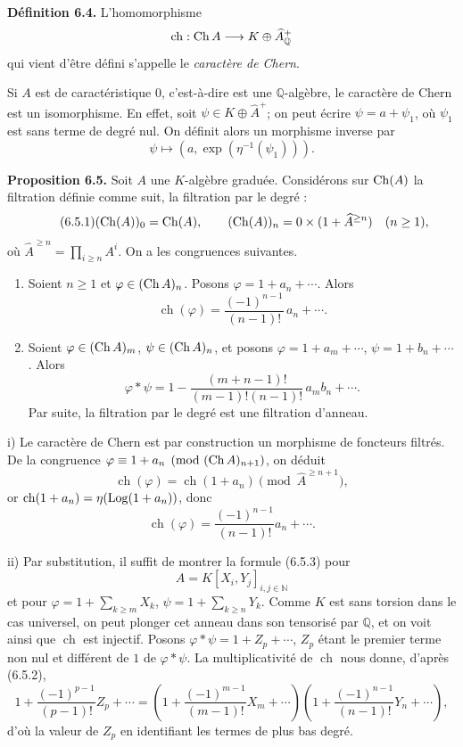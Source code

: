 \documentclass[11pt]{article}
\newcommand{\ch}{\operatorname{ch}}
\providecommand{\ch}{\operatorname{ch}}
\begin{document}
\textbf{Définition 6.4.} L'homomorphisme
\[
  \ch:\Ch A\longrightarrow K\oplus\widehat A_{\mathbb Q}^{+}
\]
qui vient d'être défini s'appelle le \emph{caractère de Chern}.

Si \(A\) est de caractéristique \(0\), c'est-à-dire est une \(\mathbb Q\)-algèbre, le caractère de Chern est un isomorphisme. En effet, soit \(\psi\in K\oplus\widehat A^+\); on peut écrire \(\psi=a+\psi_1\), où \(\psi_1\) est sans terme de degré nul. On définit alors un morphisme inverse par
\[
  \psi\longmapsto (a,\exp(\eta^{-1}(\psi_1))).
\]

\textbf{Proposition 6.5.} Soit \(A\) une \(K\)-algèbre graduée. Considérons sur \(\operatorname{Ch}(A)\) la filtration définie comme suit, la filtration par le degré :
\begin{equation}\tag{6.5.1}
  (\operatorname{Ch}(A))_0=\operatorname{Ch}(A),\qquad
  (\operatorname{Ch}(A))_n=0\times(1+\widehat A^{\ge n})\quad(n\ge1),
\end{equation}
où \(\widehat A^{\ge n}=\prod_{i\ge n}A^i\). On a les congruences suivantes.

\begin{enumerate}[label=\roman*)]
\item Soient \(n\ge1\) et \(\varphi\in(\operatorname{Ch} A)_n\). Posons \(\varphi=1+a_n+\cdots\). Alors
\begin{equation}\tag{6.5.2}
  \ch(\varphi)=\frac{(-1)^{n-1}}{(n-1)!}\,a_n+\cdots .
\end{equation}

\item Soient \(\varphi\in(\operatorname{Ch} A)_m\), \(\psi\in(\operatorname{Ch} A)_n\), et posons
\(\varphi=1+a_m+\cdots\), \(\psi=1+b_n+\cdots\). Alors
\begin{equation}\tag{6.5.3}
  \varphi*\psi
  =
  1-\frac{(m+n-1)!}{(m-1)!(n-1)!}\,a_m b_n+\cdots .
\end{equation}
Par suite, la filtration par le degré est une filtration d'anneau.
\end{enumerate}

i) Le caractère de Chern est par construction un morphisme de foncteurs filtrés. De la congruence \(\varphi\equiv1+a_n\pmod{(\operatorname{Ch} A)_{n+1}}\), on déduit
\[
  \ch(\varphi)=\ch(1+a_n)\pmod{\widehat A^{\ge n+1}},
\]
or \(\ch(1+a_n)=\eta(\Log(1+a_n))\), donc
\[
  \ch(\varphi)=\frac{(-1)^{n-1}}{(n-1)!}a_n+\cdots .
\]

ii) Par substitution, il suffit de montrer la formule (6.5.3) pour
\[
 A=K[X_i,Y_j]_{i,j\in\mathbb N}
\]
et pour \(\varphi=1+\sum_{k\ge m}X_k\), \(\psi=1+\sum_{k\ge n}Y_k\). Comme \(K\) est sans torsion dans le cas universel, on peut plonger cet anneau dans son tensorisé par \(\mathbb Q\), et on voit ainsi que \(\ch\) est injectif. Posons \(\varphi*\psi=1+Z_p+\cdots\), \(Z_p\) étant le premier terme non nul et différent de \(1\) de \(\varphi*\psi\). La multiplicativité de \(\ch\) nous donne, d'après (6.5.2),
\[
  1+\frac{(-1)^{p-1}}{(p-1)!}Z_p+\cdots
  =
  \left(1+\frac{(-1)^{m-1}}{(m-1)!}X_m+\cdots\right)
  \left(1+\frac{(-1)^{n-1}}{(n-1)!}Y_n+\cdots\right),
\]
d'où la valeur de \(Z_p\) en identifiant les termes de plus bas degré.
\end{document}
